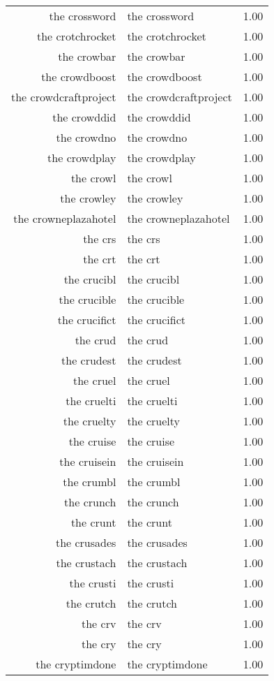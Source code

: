\begin{table}[ht]
\begin{tabular}{rlr}
  the crossword & the crossword & 1.00 \\ 
  the crotchrocket & the crotchrocket & 1.00 \\ 
  the crowbar & the crowbar & 1.00 \\ 
  the crowdboost & the crowdboost & 1.00 \\ 
  the crowdcraftproject & the crowdcraftproject & 1.00 \\ 
  the crowddid & the crowddid & 1.00 \\ 
  the crowdno & the crowdno & 1.00 \\ 
  the crowdplay & the crowdplay & 1.00 \\ 
  the crowl & the crowl & 1.00 \\ 
  the crowley & the crowley & 1.00 \\ 
  the crowneplazahotel & the crowneplazahotel & 1.00 \\ 
  the crs & the crs & 1.00 \\ 
  the crt & the crt & 1.00 \\ 
  the crucibl & the crucibl & 1.00 \\ 
  the crucible & the crucible & 1.00 \\ 
  the crucifict & the crucifict & 1.00 \\ 
  the crud & the crud & 1.00 \\ 
  the crudest & the crudest & 1.00 \\ 
  the cruel & the cruel & 1.00 \\ 
  the cruelti & the cruelti & 1.00 \\ 
  the cruelty & the cruelty & 1.00 \\ 
  the cruise & the cruise & 1.00 \\ 
  the cruisein & the cruisein & 1.00 \\ 
  the crumbl & the crumbl & 1.00 \\ 
  the crunch & the crunch & 1.00 \\ 
  the crunt & the crunt & 1.00 \\ 
  the crusades & the crusades & 1.00 \\ 
  the crustach & the crustach & 1.00 \\ 
  the crusti & the crusti & 1.00 \\ 
  the crutch & the crutch & 1.00 \\ 
  the crv & the crv & 1.00 \\ 
  the cry & the cry & 1.00 \\ 
  the cryptimdone & the cryptimdone & 1.00 \\ 

\end{tabular}
\end{table}
